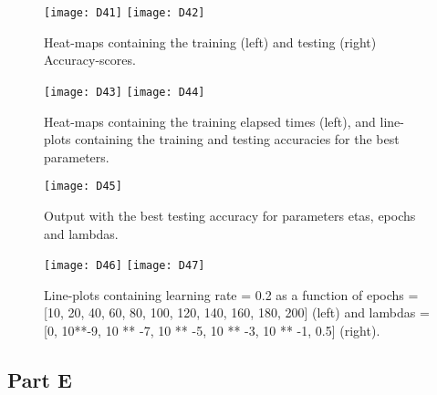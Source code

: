 \begin{figure}[H]
\label{fig:D26}
\centering
\texttt{[image: D41]}
\texttt{[image: D42]}
\caption{Heat-maps containing the training (left) and testing (right) Accuracy-scores.}
\end{figure}

\begin{figure}[H]
\label{fig:D27}
\centering
\texttt{[image: D43]}
\texttt{[image: D44]}
\caption{Heat-maps containing the training elapsed times (left), and line-plots containing the training and testing accuracies for the best parameters.}
\end{figure}

\begin{figure}[H]
\label{fig:D28}
\centering
\texttt{[image: D45]}
\caption{Output with the best testing accuracy for parameters etas, epochs and lambdas.}
\end{figure}

\begin{figure}[H]
\label{fig:D29}
\centering
\texttt{[image: D46]}
\texttt{[image: D47]}
\caption{Line-plots containing learning rate = 0.2 as a function of epochs = [10, 20, 40, 60, 80, 100, 120, 140, 160, 180, 200] (left) and lambdas = [0, 10**-9, 10 ** -7, 10 ** -5, 10 ** -3, 10 ** -1, 0.5] (right).}
\end{figure}

\subsection{Part E}
\label{chap:Part E}
